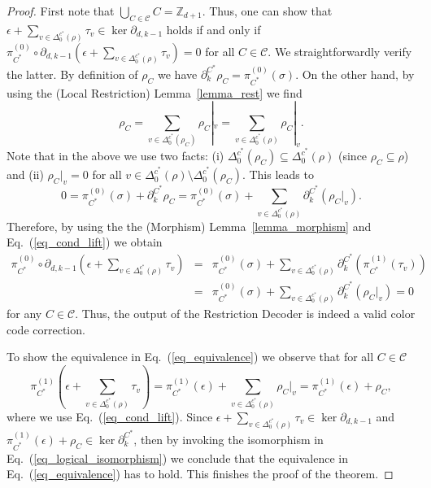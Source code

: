 \documentclass[onecolumn,letterpaper,11pt,accepted=2022-12-19]{quantumarticle}
\newcommand{\facex}[3]{{\Delta^{#1}_{#2}(#3)}}
\newcommand{\bnd}[2]{\partial_{#1,#2}}
\newcommand{\rest}[1]{|_{#1}}
\theoremstyle{definition}
\theoremstyle{lemma}
\theoremstyle{theorem}
\theoremstyle{corollary}
\begin{document}
{\begin{proof}
First note that $\bigcup_{C\in\mathcal{C}} C = \mathbb{Z}_{d+1}$.
Thus, one can show that $\epsilon + \sum_{v\in \facex {c^*} 0 \rho} \tau_v \in \ker \bnd d {k-1}$ holds if and only if $\pi^{(0)}_{C^*}\circ\bnd d {k-1}(\epsilon + \sum_{v\in \facex {c^*} 0 \rho} \tau_v) = 0$ for all $C\in\mathcal{C}$.
We straightforwardly verify the latter.
By definition of $\rho_C$ we have $\partial_k^{C^*} \rho_C = \pi^{(0)}_{C^*}(\sigma)$. 
On the other hand, by using the (Local Restriction) Lemma~\ref{lemma_rest} we find
\begin{equation}
\rho_C = \sum_{v\in\facex {c^*} 0 {\rho_C} } \rho_C\rest v = \sum_{v\in \facex {c^*} 0 \rho} \rho_C\rest v.
\end{equation}
Note that in the above we use two facts: (i) $\facex {c^*} 0 {\rho_C} \subseteq \facex {c^*} 0 \rho$ (since $\rho_C \subseteq \rho$) and (ii) $\rho_C\rest v = 0$ for all $v\in \facex {c^*} 0 \rho \setminus \facex {c^*} 0 {\rho_C}$.
This leads to
\begin{equation}
0 = \pi^{(0)}_{C^*}(\sigma) + \partial_k^{C^*} \rho_C = \pi^{(0)}_{C^*}(\sigma) + \sum_{v\in \facex {c^*} 0 \rho} \partial_k^{C^*} (\rho_C\rest v).
\end{equation}
Therefore, by using the the (Morphism) Lemma~\ref{lemma_morphism} and Eq.~(\ref{eq_cond_lift}) we obtain
\begin{eqnarray}
\pi^{(0)}_{C^*}\circ\bnd d {k-1}\left(\epsilon + \sum_{v\in \facex {c^*} 0 \rho} \tau_v\right) 
&=& \pi^{(0)}_{C^*}(\sigma) + \sum_{v\in \facex {c^*} 0 \rho} \partial_k^{C^*}(\pi^{(1)}_{C^*}(\tau_v))\\
&=& \pi^{(0)}_{C^*}(\sigma) + \sum_{v\in \facex {c^*} 0 \rho} \partial_k^{C^*}(\rho_C\rest v) = 0
\end{eqnarray}
for any $C\in\mathcal{C}$.
Thus, the output of the Restriction Decoder is indeed a valid color code correction.


To show the equivalence in Eq.~(\ref{eq_equivalence}) we observe that for all $C\in\mathcal{C}$
\begin{equation}
\label{eq_proj1}
\pi^{(1)}_{C^*}\left(\epsilon + \sum_{v\in \facex {c^*} 0 \rho} \tau_v\right)
= \pi^{(1)}_{C^*}(\epsilon) + \sum_{v\in \facex {c^*} 0 \rho} \rho_C\rest v = \pi^{(1)}_{C^*}(\epsilon) + \rho_C,
\end{equation}
where we use Eq.~(\ref{eq_cond_lift}).
Since $\epsilon + \sum_{v\in \facex {c^*} 0 \rho} \tau_v\in\ker\bnd d {k-1}$ and $\pi^{(1)}_{C^*}(\epsilon) + \rho_C\in\ker\partial_k^{C^*}$, then by invoking the isomorphism in Eq.~(\ref{eq_logical_isomorphism}) we conclude that the equivalence in Eq.~(\ref{eq_equivalence}) has to hold.
This finishes the proof of the theorem.
\end{proof}


}
\end{document}
